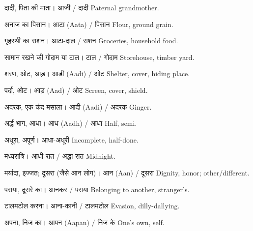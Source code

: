 %
{दादी, पिता की माता।}%
{आजी / दादी}%
{Paternal grandmother.}

%
{अनाज का पिसान।}%
{आटा (Aata) / पिसान}%
{Flour, ground grain.}

%
{गृहस्थी का राशन।}%
{आटा-दाल / राशन}%
{Groceries, household food.}

%
{सामान रखने की गोदाम या टाल।}%
{टाल / गोदाम}%
{Storehouse, timber yard.}

%
{शरण, ओट, आड़।}%
{आडी (Aadi) / ओट}%
{Shelter, cover, hiding place.}

%
{पर्दा, ओट।}%
{आड़ (Aad) / ओट}%
{Screen, cover, shield.}

%
{अदरक, एक कंद मसाला।}%
{आदी (Aadi) / अदरक}%
{Ginger.}

%
{अर्द्ध भाग, आधा।}%
{आध (Aadh) / आधा}%
{Half, semi.}

%
{अधूरा, अपूर्ण।}%
{आधा-अधूरी}%
{Incomplete, half-done.}

%
{मध्यरात्रि।}%
{आधी-रात / अद्धा रात}%
{Midnight.}

%
{मर्यादा, इज्जत; दूसरा (जैसे आन लोग)।}%
{आन (Aan) / दूसरा}%
{Dignity, honor; other/different.}

%
{पराया, दूसरे का।}%
{आनकर / पराया}%
{Belonging to another, stranger's.}

%
{टालमटोल करना।}%
{आना-कानी / टालमटोल}%
{Evasion, dilly-dallying.}

%
{अपना, निज का।}%
{आपन (Aapan) / निज के}%
{One's own, self.}

